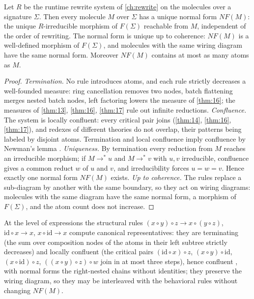 \begin{theorem}\label{thm:23}
 Let $R$ be the runtime rewrite system of
\autoref{ch:rewrite} on the molecules over a signature $\Sigma$. Then every
molecule $M$ over $\Sigma$ has a unique normal form $\mathit{NF} (M)$: the
unique $R$-irreducible morphism of $F (\Sigma)$ reachable from $M$, independent
of the order of rewriting. The normal form is unique up to coherence:
$\mathit{NF} (M)$ is a well-defined morphism of $F (\Sigma)$, and molecules
with the same wiring diagram have the same normal form. Moreover
$\mathit{NF} (M)$ contains at most as many atoms as $M$.
\end{theorem}

\begin{proof}
\emph{Termination.} No rule introduces atoms, and each rule strictly
decreases a well-founded measure: ring cancellation removes two nodes, batch
flattening merges nested batch nodes, left factoring lowers the measure of
\autoref{thm:16}; the measures of \autoref{thm:13}, \autoref{thm:16}, \autoref{thm:17} rule out infinite reductions.
\emph{Confluence.} The system is locally confluent: every critical pair joins
(\autoref{thm:14}, \autoref{thm:16}, \autoref{thm:17}), and redexes of different theories do not overlap, their
patterns being labeled by disjoint atoms. Termination and local confluence
imply confluence by Newman's lemma \cite{newman}.
\emph{Uniqueness.} By termination every reduction from $M$ reaches an
irreducible morphism; if $M \to^{*} u$ and $M \to^{*} v$ with $u, v$
irreducible, confluence gives a common reduct $w$ of $u$ and $v$, and
irreducibility forces $u = w = v$. Hence exactly one normal form
$\mathit{NF} (M)$ exists.
\emph{Up to coherence.} The rules replace a sub-diagram by another with the
same boundary, so they act on wiring diagrams: molecules with the same
diagram have the same normal form, a morphism of $F (\Sigma)$, and the atom
count does not increase.
\end{proof}

At the level of expressions the structural rules $(x \circ y) \circ z \to
x \circ (y \circ z)$, $\mathrm{id} \circ x \to x$, $x \circ \mathrm{id} \to
x$ compute canonical representatives: they are terminating (the sum over
composition nodes of the atoms in their left subtree strictly decreases) and
locally confluent (the critical pairs $(\mathrm{id} \circ x) \circ z$,
$(x \circ y) \circ \mathrm{id}$, $(x \circ \mathrm{id}) \circ z$,
$((x \circ y) \circ z) \circ w$ join in at most three steps), hence confluent
\cite{newman}, with normal forms the right-nested chains without identities;
they preserve the wiring diagram, so they may be interleaved with the
behavioral rules without changing $\mathit{NF} (M)$.

